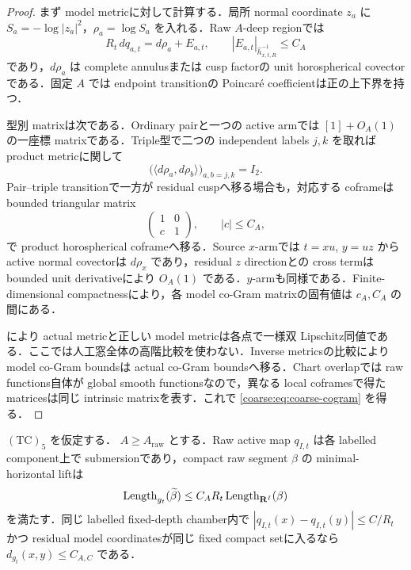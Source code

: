 \documentclass[a4paper,11pt]{ltjsarticle}
\numberwithin{equation}{section}
\theoremstyle{plain}
\theoremstyle{definition}
\theoremstyle{remark}
\newcommand{\Length}{\operatorname{Length}}\newcommand{\Lip}{\operatorname{Lip}}\newcommand{\GH}{\mathrm{GH}}\newcommand{\id}{\mathrm{id}}
\begin{document}
\begin{proof}
まず model metricに対して計算する．局所 normal coordinate $z_a$ に
$S_a=-\log|z_a|^2$，$\rho_a=\log S_a$ を入れる．Raw $A$-deep regionでは
\begin{equation}\label{coarse:eq:coarse-raw-local}
 R_t\,dq_{a,t}=d\rho_a+E_{a,t},
 \qquad |E_{a,t}|_{\widehat h_{x,t,R}^{-1}}\le C_A
\end{equation}
であり，$d\rho_a$ は complete annulusまたは cusp factorの unit horospherical covectorである．固定 $A$ では endpoint transitionの Poincar\'e coefficientは正の上下界を持つ．

型別 matrixは次である．Ordinary pairと一つの active armでは $[1]+O_A(1)$ の一座標 matrixである．Triple型で二つの independent labels $j,k$ を取れば product metricに関して
\[
 \bigl(\langle d\rho_a,d\rho_b\rangle\bigr)_{a,b=j,k}=I_2.
\]
Pair--triple transitionで一方が residual cuspへ移る場合も，対応する coframeは bounded triangular matrix
\[
 \begin{pmatrix}1&0\\c&1\end{pmatrix},\qquad |c|\le C_A,
\]
で product horospherical coframeへ移る．Source $x$-armでは $t=xu$, $y=uz$ から active normal covectorは $d\rho_x$ であり，residual $z$ directionとの cross termは bounded unit derivativeにより $O_A(1)$ である．$y$-armも同様である．Finite-dimensional compactnessにより，各 model co-Gram matrixの固有値は $c_A,C_A$ の間にある．

 により actual metricと正しい model metricは各点で一様双 Lipschitz同値である．ここでは人工窓全体の高階比較を使わない．Inverse metricsの比較により model co-Gram boundsは actual co-Gram boundsへ移る．Chart overlapでは raw functions自体が global smooth functionsなので，異なる local coframesで得た matricesは同じ intrinsic matrixを表す．これで \eqref{coarse:eq:coarse-cogram} を得る．
\end{proof}

\begin{corollary}\label{coarse:cor:coarse-horizontal-lift}
$\mathrm{(TC)}_5$ を仮定する．
$A\ge A_{\mathrm{raw}}$ とする．Raw active map $q_{I,t}$ は各 labelled component上で submersionであり，compact raw segment $\beta$ の minimal-horizontal liftは
\[
 \Length_{g_t}(\widetilde\beta)
 \le C_A R_t\Length_{\RR^I}(\beta)
\]
を満たす．同じ labelled fixed-depth chamber内で
$|q_{I,t}(x)-q_{I,t}(y)|\le C/R_t$ かつ residual model coordinatesが同じ fixed compact setに入るなら
$d_{g_t}(x,y)\le C_{A,C}$ である．
\end{corollary}
\end{document}
